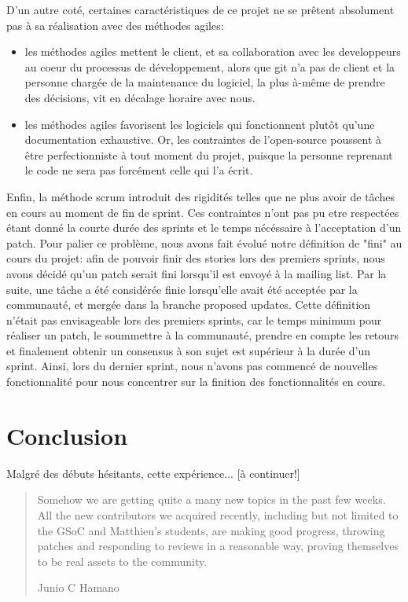 \documentclass[a4paper, 12pt]{article}
\begin{document}
D'un autre coté, certaines caractéristiques de ce projet ne se prêtent absolument pas à sa réalisation avec des méthodes agiles:
\begin{itemize}
\item les méthodes agiles mettent le client, et sa collaboration avec les developpeurs au coeur du processus de développement, alors que git n'a pas de client et la personne chargée de la maintenance du logiciel, la plus à-même de prendre des décisions, vit en décalage horaire avec nous.
\item les méthodes agiles favorisent les logiciels qui fonctionnent plutôt qu'une documentation exhaustive.
Or, les contraintes de l'open-source poussent à être perfectionniste à tout moment du projet, puisque la personne reprenant le code ne sera pas forcément celle qui l'a écrit.
\end{itemize}

Enfin, la méthode scrum introduit des rigidités telles que ne plus avoir de tâches en cours au moment de fin de sprint.
Ces contraintes n'ont pas pu etre respectées étant donné la courte durée des sprints et le temps nécéssaire à l'acceptation d'un patch.
Pour palier ce problème, nous avons fait évolué notre définition de "fini" au cours du projet: afin de pouvoir finir des stories lors des premiers sprints, nous avons décidé qu'un patch serait fini lorsqu'il est envoyé à la mailing list.
Par la suite, une tâche a été considérée finie lorsqu'elle avait été acceptée par la communauté, et mergée dans la branche proposed updates.
Cette définition n'était pas envisageable lors des premiers sprints, car le temps minimum pour réaliser un patch, le soummettre à la communauté, prendre en compte les retours et finalement obtenir un consensus à son sujet est supérieur à la durée d'un sprint.
Ainsi, lors du dernier sprint, nous n'avons pas commencé de nouvelles fonctionnalité pour nous concentrer sur la finition des fonctionnalités en cours.

\section{Conclusion}

Malgré des débuts hésitants, cette expérience... [à continuer!]

\begin{quote} 
   Somehow we are getting quite a many new topics in the past few
weeks.  All the new contributors we acquired recently, including but not limited to the GSoC and Matthieu's students, are making good progress, throwing patches and responding to reviews in a reasonable way, proving themselves to be real assets to the community.
   \begin{flushright}
      Junio C Hamano
   \end{flushright}
\end{quote}
\end{document}
